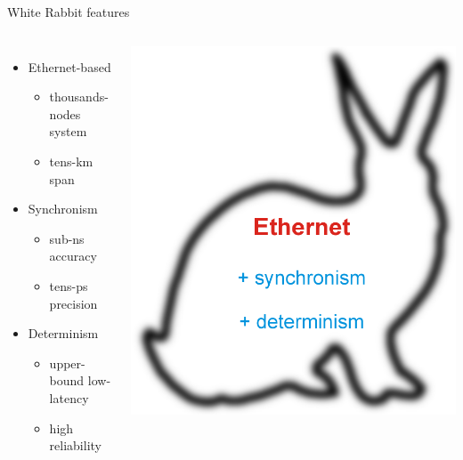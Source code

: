 \documentclass[compress,red]{beamer}
\begin{document}
\begin{frame}{White Rabbit features}

\begin{columns}[c]
	  \begin{itemize}
		  \item Ethernet-based
        \begin{itemize}
		      \item thousands-nodes system
		      \item tens-km span
        \end{itemize}
      \item Synchronism
        \begin{itemize}
		      \item sub-ns accuracy
		      \item tens-ps precision
        \end{itemize}
      \item Determinism
        \begin{itemize}
		      \item upper-bound low-latency
		      \item high reliability
        \end{itemize}
	  \end{itemize}
		\begin{center}
		\includegraphics[width=1.0\textwidth]{misc/rabbit.pdf}
		\end{center}
	\end{columns}

\end{frame}
\end{document}
